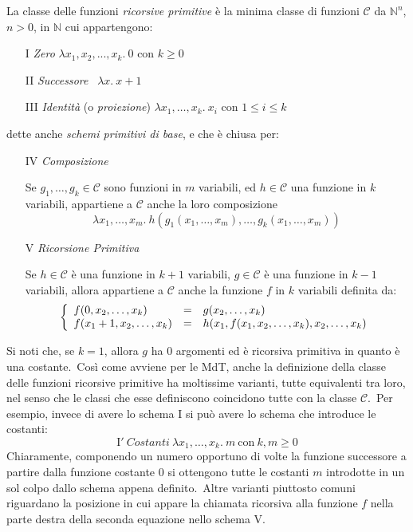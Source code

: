 \begin{definition}
    La classe delle funzioni \textit{ricorsive primitive} è la minima classe di funzioni $\mathcal{C}$ da $\mathbb{N}^n$, $n >0$, in $\mathbb{N}$ cui appartengono:

    \begin{itemize}
        \item[I] \textit{Zero} \qquad\qquad\qquad\qquad $\lambda x_1,x_2,...,x_k.\ 0$ con $k\geq 0$
        \item[II] \textit{Successore} \qquad\qquad\ \quad $\lambda x.\ x+1$
        \item[III] \textit{Identità} (o \textit{proiezione}) $\lambda x_1,\dots,x_k.\ x_i$ con $1 \leq i \leq k$
    \end{itemize}
    dette anche \textit{schemi primitivi di base}, e che è chiusa per:
    \begin{itemize}
        \item[IV] \textit{Composizione}

              Se $g_1,\dots,g_k \in \mathcal{C}$ sono funzioni in $m$ variabili, ed $h\in \mathcal{C}$ una funzione in $k$ variabili, appartiene a $\mathcal{C}$ anche la loro composizione
              \[\lambda x_1,\dots,x_m.\ h(g_1(x_1,\dots,x_m),\dots,g_k(x_1,\dots,x_m))\]
        \item[V] \textit{Ricorsione Primitiva}

              Se $h \in \mathcal{C}$ è una funzione in $k+1$ variabili, $g\in \mathcal{C}$ è una funzione in $k-1$ variabili, allora appartiene a $\mathcal{C}$ anche la funzione $f$ in $k$ variabili definita da:
              \[\left\{\begin{array}{l c l}
                      f(0,x_2,\dots,x_k)     & = & g(x_2,\dots,x_k)                          \\
                      f(x_1+1,x_2,\dots,x_k) & = & h(x_1,f(x_1,x_2,\dots,x_k),x_2,\dots,x_k) \\
                  \end{array}\right.\]
    \end{itemize}
\end{definition}

\newpage

\noindent Si noti che, se $k = 1$, allora $g$ ha 0 argomenti ed è ricorsiva primitiva in quanto è una costante.\
Così come avviene per le MdT, anche la definizione della classe delle funzioni ricorsive primitive ha moltissime varianti, tutte equivalenti tra loro, nel senso che le classi che esse definiscono coincidono tutte con la classe $\mathcal{C}$.\
Per esempio, invece di avere lo schema I si può avere lo schema che introduce le costanti:
\[\mathrm{I}'\ \mathit{Costanti}\ \lambda x_1, \dots, x_k.\ m\ \mathrm{con}\ k,m\geq 0\]
Chiaramente, componendo un numero opportuno di volte la funzione successore a partire dalla funzione costante 0 si ottengono tutte le costanti $m$ introdotte in un sol colpo dallo schema appena definito.\
Altre varianti piuttosto comuni riguardano la posizione in cui appare la chiamata ricorsiva alla funzione $f$ nella parte destra della seconda equazione nello schema V.

